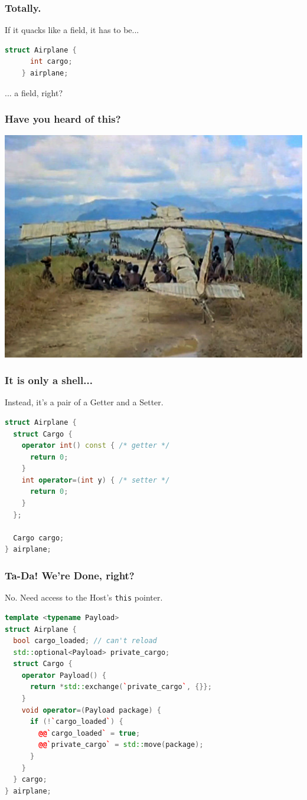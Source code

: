 \documentclass{beamer}
\def\code#1{\texttt{#1}}
\begin{document}
\begin{frame}[fragile]
  \frametitle{Totally.}
  If it quacks like a field, it has to be...
  
  \begin{lstlisting}[language=cpp]
    struct Airplane {
      int cargo;
    } airplane;
  \end{lstlisting}
  
  ... a field, right?
\end{frame}


\begin{frame}[fragile]
  \frametitle{Have you heard of this?}

  \includegraphics[width=\textwidth]{CargoCultAirplane.jpg}
\end{frame}


\begin{frame}[fragile]
  \frametitle{It is only a shell...}
 
  Instead, it's a pair of a Getter and a Setter.
  \begin{lstlisting}[language=cpp]
struct Airplane {
  struct Cargo {
    operator int() const { /* getter */
      return 0;
    }
    int operator=(int y) { /* setter */
      return 0;
    }
  };

  Cargo cargo;
} airplane;
  \end{lstlisting}
\end{frame}


\begin{frame}[fragile]
  \frametitle{Ta-Da! We're Done, right?}

  No. Need access to the Host's \code{this} pointer.
  \begin{lstlisting}[language=cpp]
template <typename Payload>
struct Airplane {
  bool cargo_loaded; // can't reload
  std::optional<Payload> private_cargo;
  struct Cargo {
    operator Payload() {
      return *std::exchange(`private_cargo`, {}};
    }
    void operator=(Payload package) {
      if (!`cargo_loaded`) {
        @@`cargo_loaded` = true;
        @@`private_cargo` = std::move(package);
      }
    }
  } cargo;
} airplane;
  \end{lstlisting}
\end{frame}
\end{document}
